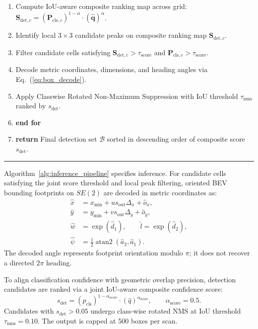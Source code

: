 {\begin{enumerate}
    \item \quad Compute IoU-aware composite ranking map across grid: $\mathbf{S}_{\mathrm{det}, c} = (\mathbf{P}_{\mathrm{cls}, c})^{1 - \alpha} \cdot (\widehat{\mathbf{q}})^\alpha$.
    \item \quad Identify local $3 \times 3$ candidate peaks on composite ranking map $\mathbf{S}_{\mathrm{det}, c}$.
    \item \quad Filter candidate cells satisfying $\mathbf{S}_{\mathrm{det}, c} > \tau_{\mathrm{score}}$ and $\mathbf{P}_{\mathrm{cls}, c} > \tau_{\mathrm{score}}$.
    \item \quad Decode metric coordinates, dimensions, and heading angles via Eq.~(\ref{eq:box_decode}).
    \item \quad Apply Classwise Rotated Non-Maximum Suppression with IoU threshold $\tau_{\mathrm{nms}}$ ranked by $s_{\mathrm{det}}$.
    \item \textbf{end for}
    \item \textbf{return} Final detection set $\mathcal{B}$ sorted in descending order of composite score $s_{\mathrm{det}}$.
\end{enumerate}
\par\vspace{2pt}\noindent\rule{\linewidth}{0.6pt}\par
}

\par\vspace{0.5\baselineskip}


Algorithm~\ref{alg:inference_pipeline} specifies inference. For candidate cells satisfying the joint score threshold and local peak filtering, oriented BEV bounding footprints on $SE(2)$ are decoded in metric coordinates as:
\begin{align}
    \hat{x} &= x_{\min} + u s_{\mathrm{out}}\Delta_x + \hat{o}_x, \nonumber\\
    \hat{y} &= y_{\min} + v s_{\mathrm{out}}\Delta_y + \hat{o}_y, \nonumber\\
    \hat{w} &= \exp(\hat{d}_1), \qquad \hat{l} = \exp(\hat{d}_2), \nonumber\\
    \hat{\psi} &= \frac{1}{2}\operatorname{atan2}(\hat{a}_2, \hat{a}_1).
    \label{eq:box_decode}
\end{align}
The decoded angle represents footprint orientation modulo $\pi$; it does not recover a directed $2\pi$ heading.

To align classification confidence with geometric overlap precision, detection candidates are ranked via a joint IoU-aware composite confidence score:
\begin{equation}
    s_{\mathrm{det}} = (p_{\mathrm{cls}})^{1 - \alpha_{\mathrm{score}}} \cdot (\hat{q})^{\alpha_{\mathrm{score}}}, \qquad \alpha_{\mathrm{score}} = 0.5.
    \label{eq:joint_score}
\end{equation}
Candidates with $s_{\mathrm{det}} > 0.05$ undergo class-wise rotated NMS at IoU threshold $\tau_{\mathrm{nms}} = 0.10$. The output is capped at 500 boxes per scan.

